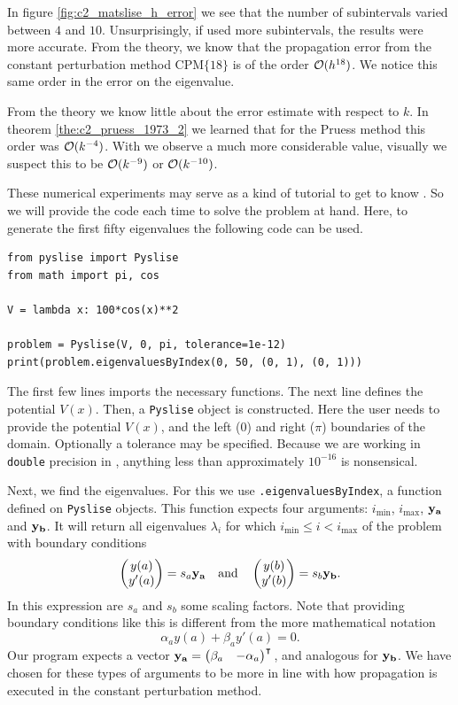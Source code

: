 In figure \ref{fig:c2_matslise_h_error} we see that the number of subintervals varied between $4$ and $10$. Unsurprisingly, if \matslise{} used more subintervals, the results were more accurate. From the theory, we know that the propagation error from the constant perturbation method $\text{CPM}\{18\}$ is of the order $\operatorname{\mathcal{O}}(h^{18})$. We notice this same order in the error on the eigenvalue.

From the theory we know little about the error estimate with respect to $k$. In theorem \ref{the:c2_pruess_1973_2} we learned that for the Pruess method this order was $\operatorname{\mathcal{O}}(k^{-4})$. With \matslise{} we observe a much more considerable value, visually we suspect this to be $\operatorname{\mathcal{O}}(k^{-9})$ or $\operatorname{\mathcal{O}}(k^{-10})$.

These numerical experiments may serve as a kind of tutorial to get to know \pyslise{}. So we will provide the code each time to solve the problem at hand. Here, to generate the first fifty eigenvalues the following code can be used.
\begin{verbatim}
from pyslise import Pyslise
from math import pi, cos

V = lambda x: 100*cos(x)**2

problem = Pyslise(V, 0, pi, tolerance=1e-12)
print(problem.eigenvaluesByIndex(0, 50, (0, 1), (0, 1)))
\end{verbatim}

The first few lines imports the necessary functions. The next line defines the potential $V(x)$. Then, a \texttt{Pyslise} object is constructed. Here the user needs to provide the potential $V(x)$, and the left ($0$) and right ($\pi$) boundaries of the domain. Optionally a tolerance may be specified. Because we are working in \texttt{double} precision in \lpython{}, anything less than approximately $10^{-16}$ is nonsensical.

Next, we find the eigenvalues. For this we use \texttt{.eigenvaluesByIndex}, a function defined on \texttt{Pyslise} objects. This function expects four arguments: $i_\text{min}$, $i_\text{max}$, $\vb{y_a}$ and $\vb{y_b}$. It will return all eigenvalues $\lambda_i$ for which $i_\text{min} \leq i < i_\text{max}$ of the problem with boundary conditions
$$
    \begin{pmatrix}y(a) \\ y'(a)\end{pmatrix} = s_a \vb{y_a} \quad\text{and}\quad \begin{pmatrix}y(b) \\ y'(b)\end{pmatrix} = s_b \vb{y_b}\text{.}
$$
In this expression are $s_a$ and $s_b$ some scaling factors. Note that providing boundary conditions like this is different from the more mathematical notation
$$
    \alpha_a y(a) + \beta_a y'(a) = 0\text{.}
$$
Our program expects a vector $\vb{y_a} = \begin{pmatrix}\beta_a & - \alpha_a\end{pmatrix}^\intercal{}$, and analogous for $\vb{y_b}$. We have chosen for these types of arguments to be more in line with how propagation is executed in the constant perturbation method.

